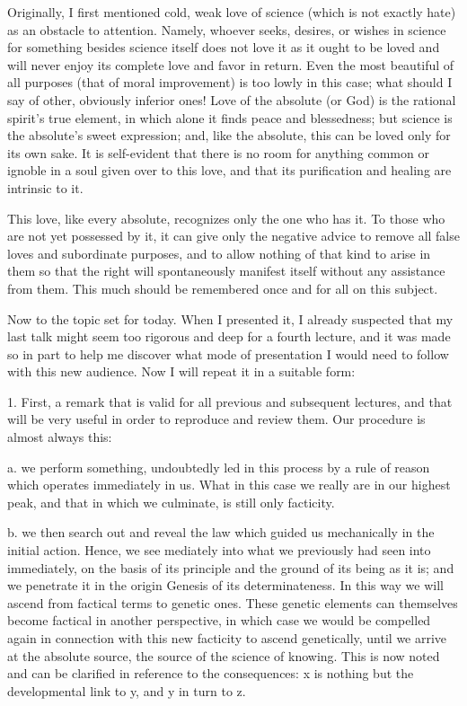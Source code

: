 Originally, I first mentioned cold, weak love of science
(which is not exactly hate) as an obstacle to attention.
Namely, whoever seeks, desires, or wishes in science
for something besides science itself does not love it
as it ought to be loved and will never enjoy
its complete love and favor in return.
Even the most beautiful of all purposes
(that of moral improvement)
is too lowly in this case;
what should I say of other, obviously inferior ones!
Love of the absolute (or God) is the rational spirit’s true element,
in which alone it finds peace and blessedness;
but science is the absolute’s sweet expression;
and, like the absolute, this can be loved only for its own sake.
It is self-evident that there is no room for anything
common or ignoble in a soul given over to this love,
and that its purification and healing are intrinsic to it.

This love, like every absolute,
recognizes only the one who has it.
To those who are not yet possessed by it,
it can give only the negative advice to remove
all false loves and subordinate purposes,
and to allow nothing of that kind to arise in them
so that the right will spontaneously manifest itself
without any assistance from them.
This much should be remembered
once and for all on this subject.

Now to the topic set for today.
When I presented it, I already suspected that
my last talk might seem too rigorous and deep for a fourth lecture,
and it was made so in part to help me discover what mode of presentation
I would need to follow with this new audience.
Now I will repeat it in a suitable form:

1. First, a remark that is valid
for all previous and subsequent lectures,
and that will be very useful in order
to reproduce and review them.
Our procedure is almost always this:

a. we perform something, undoubtedly led in this process
by a rule of reason which operates immediately in us.
What in this case we really are in our highest peak,
and that in which we culminate, is still only facticity.

b. we then search out and reveal the law
which guided us mechanically in the initial action.
Hence, we see mediately into
what we previously had seen into immediately,
on the basis of its principle
and the ground of its being as it is;
and we penetrate it in the origin {Genesis}
of its determinateness.
In this way we will ascend
from factical terms to genetic ones.
These genetic elements can themselves
become factical in another perspective,
in which case we would be compelled again
in connection with this new facticity
to ascend genetically,
until we arrive at the absolute source,
the source of the science of knowing.
This is now noted and can be clarified
in reference to the consequences:
x is nothing but the developmental link to y,
and y in turn to z.

